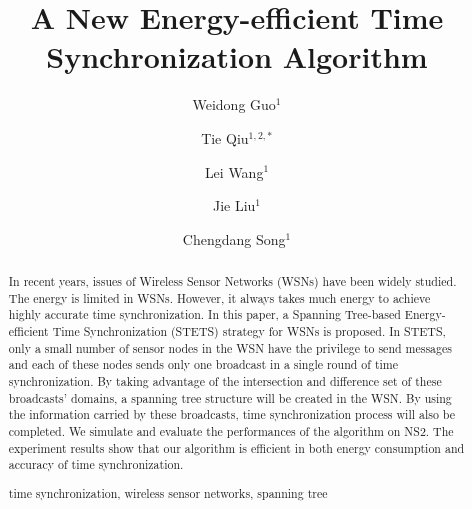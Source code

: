 \documentclass[runningheads,a4paper]{llncs}
\newcommand{\keywords}[1]{\par\addvspace\baselineskip
\noindent\keywordname\enspace\ignorespaces#1}
\begin{document}
\mainmatter  %


\title{A New Energy-efficient Time Synchronization Algorithm}

\titlerunning{ }

%
%




\author{Weidong Guo$^1$%
\and Tie Qiu$^{1,2,*}$\and Lei Wang$^1$\and Jie Liu$^1$\and Chengdang Song$^1$}
%
\authorrunning{ }



\maketitle


\begin{abstract}
In recent years, issues of Wireless Sensor Networks (WSNs) have been widely studied. The energy is limited in WSNs. However, it always takes much energy to achieve highly accurate time synchronization. In this paper, a Spanning Tree-based Energy-efficient Time Synchronization (STETS) strategy for WSNs is proposed. In STETS, only a small number of sensor nodes in the WSN have the privilege to send messages and each of these nodes sends only one broadcast in a single round of time synchronization. By taking advantage of the intersection and difference set of these broadcasts' domains, a spanning tree structure will be created in the WSN. By using the information carried by these broadcasts, time synchronization process will also be completed. We simulate and evaluate the performances of the algorithm on NS2. The experiment results show that our algorithm is efficient in both energy consumption and accuracy of time synchronization.
\keywords{ time synchronization, wireless sensor networks, spanning tree}
\end{abstract}
\end{document}
